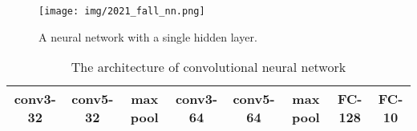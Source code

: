 \begin{figure}[ht]
    \centering\texttt{[image: img/2021\_fall\_nn.png]}
    \caption{A neural network with a single hidden layer.}
    \label{backpropogation}
\end{figure}

\begin{table}[ht]
    \centering
    \begin{tabular}{|c|c|c|c|c|c|c|c|}
        \hline
        conv3-32 & conv5-32 & max pool & conv3-64 & conv5-64 & max pool & FC-128 & FC-10 \\
        \hline
    \end{tabular}
    \caption{The architecture of convolutional neural network} \label{tab:cnn}
\end{table}
\clearpage




